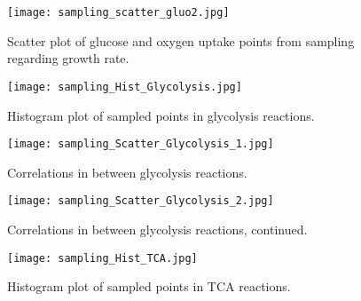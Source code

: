 \begin{figure}[H]
\begin{center}
\texttt{[image: sampling\_scatter\_gluo2.jpg]}
\end{center}
\caption[Scatter plot of glucose and oxygen uptake points from sampling]{Scatter plot of glucose and oxygen uptake points from sampling regarding growth rate.}
\label{fig:sampling_scatter_gluo2}
\end{figure}

\begin{landscape}
 \begin{figure}[H]
    \begin{sidewaysfigure}
     \texttt{[image: sampling\_Hist\_Glycolysis.jpg]}
    \end{sidewaysfigure}
 \caption[Histogram plots of available flux values for glycolysis reactions]{Histogram plot of sampled points in glycolysis reactions.}
 \label{fig:sampling_Hist_Glycolysis}
 \end{figure}

 \begin{figure}[H]
    \begin{sidewaysfigure}
     \texttt{[image: sampling\_Scatter\_Glycolysis\_1.jpg]}
    \end{sidewaysfigure}
 \caption[Correlations in between glycolysis reactions]{Correlations in between glycolysis reactions.}
 \label{fig:sampling_Scatter_Glycolysis_1}
 \end{figure}

 \begin{figure}[H]
   \begin{sidewaysfigure}
    \texttt{[image: sampling\_Scatter\_Glycolysis\_2.jpg]}
    \end{sidewaysfigure}
 \caption[Correlations in between glycolysis reactions, continued]{Correlations in between glycolysis reactions, continued.}
 \label{fig:sampling_Scatter_Glycolysis_2}
 \end{figure}

  \begin{figure}[H]
     \begin{sidewaysfigure}
      \texttt{[image: sampling\_Hist\_TCA.jpg]}
     \end{sidewaysfigure}
  \caption[Histogram plots of available flux values for TCA reactions]{Histogram plot of sampled points in TCA reactions.}
  \label{fig:sampling_Hist_TCA}
  \end{figure}


\end{landscape}
